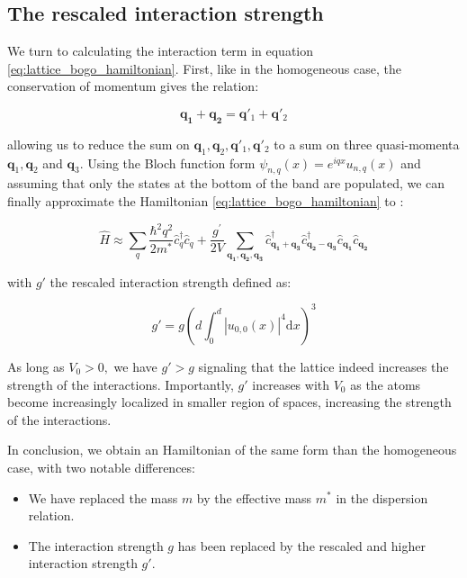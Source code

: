 \subsection{The rescaled interaction strength}

\label{sec:rescaled_interaction}

We turn to calculating the interaction term in equation \ref{eq:lattice_bogo_hamiltonian}. First, like in the homogeneous case, the conservation of momentum gives the relation:

\begin{equation}
    \bm{q_1} + \bm{q_2} = \bm{q}'_1 + \bm{q}'_2
\end{equation}

\noindent allowing us to reduce the sum on $\bm{q}_1,\bm{q}_2, \bm{q}'_1, \bm{q}'_2$ to a sum on three quasi-momenta $\bm{q}_1,\bm{q}_2$ and $\bm{q}_3$. Using the Bloch function form $\psi_{n,q} (x)= e^{iqx} u_{n,q} (x)$ and assuming that only the states at the bottom of the band are populated, we can finally approximate the Hamiltonian \ref{eq:lattice_bogo_hamiltonian} to \cite{dalibard2013cages}:

\begin{equation}
    \hat{H} \approx \sum_{q} \frac{\hbar^{2} q^{2}}{2 m^{*}} \hat{c}_{q}^{\dagger} \hat{c}_{q}+\frac{g^{\prime}}{2 V} \sum_{\bm{q_{1}}, \bm{q_{2}}, \bm{q_{3}}} \hat{c}^{\dagger}_{\bm{q_1}+\bm{q_3}} \hat{c}^{\dagger}_{\bm{q_2}-\bm{q_3}} \hat{c}_{\bm{q_1}} \hat{c}_{\bm{q_2}} 
\end{equation}

\noindent with $g'$ the rescaled interaction strength defined as:

\begin{equation}
    g' = g \left(d \int_0^d |u_{0,0} (x)|^4 \mathrm{d}x \right)^3
\end{equation}

\noindent As long as $V_0 > 0,$ we have $g' > g$ signaling that the lattice indeed increases the strength of the interactions. Importantly, $g'$ increases with $V_0$ as the atoms become increasingly localized in smaller region of spaces, increasing the strength of the interactions.

In conclusion, we obtain an Hamiltonian of the same form than the homogeneous case, with two notable differences:

\begin{itemize}
    \item We have replaced the mass $m$ by the effective mass $m^*$ in the dispersion relation.
    \item The interaction strength $g$ has been replaced by the rescaled and higher interaction strength $g'$.
\end{itemize}

